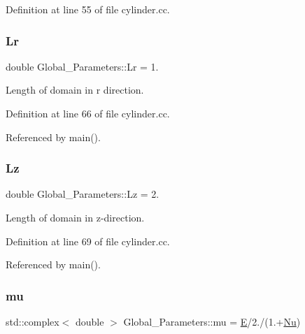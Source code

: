 Definition at line 55 of file cylinder.\+cc.

\mbox{\label{namespaceGlobal__Parameters_a444f5c911c8805ad2ba45ed8b1b8904e}} 
\subsubsection{\texorpdfstring{Lr}{Lr}}
{\footnotesize\ttfamily double Global\+\_\+\+Parameters\+::\+Lr = 1.}



Length of domain in r direction. 



Definition at line 66 of file cylinder.\+cc.



Referenced by main().

\mbox{\label{namespaceGlobal__Parameters_a2bcf0bd846d839f1e3bb04a6c0a612c1}} 
\subsubsection{\texorpdfstring{Lz}{Lz}}
{\footnotesize\ttfamily double Global\+\_\+\+Parameters\+::\+Lz = 2.}



Length of domain in z-\/direction. 



Definition at line 69 of file cylinder.\+cc.



Referenced by main().

\mbox{\label{namespaceGlobal__Parameters_a49a27047b96fb3d9ec374f7649e46d89}} 
\subsubsection{\texorpdfstring{mu}{mu}}
{\footnotesize\ttfamily std\+::complex$<$ double $>$ Global\+\_\+\+Parameters\+::mu = \hyperlink{namespaceGlobal__Parameters_ac74d762d76b56416281173421b018460}{E}/2./(1.+\hyperlink{namespaceGlobal__Parameters_a5978c2a1498ec7775b228a11a3912209}{Nu})}



